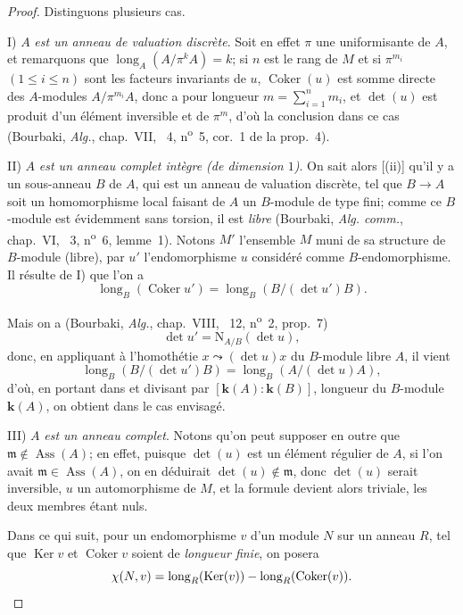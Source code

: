 \begin{proof}
Distinguons plusieurs cas.

I) $A$ \emph{est un anneau de valuation discrète}.
Soit en effet $\pi$ une uniformisante de $A$, et remarquons que $\operatorname{long}_A(A/\pi^kA)=k$;
si $n$ est le rang de $M$ et si $\pi^{m_i}$ $(1\leq i\leq n)$ sont les facteurs invariants de $u$, $\operatorname{Coker}(u)$ est somme directe des $A$-modules $A/\pi^{m_i}A$, donc a pour longueur $m=\sum_{i=1}^nm_i$, et $\det(u)$ est produit d'un élément inversible et de $\pi^m$, d'où la conclusion dans ce cas (Bourbaki, \emph{Alg.}, chap.~VII, \textsection~4, n\textsuperscript{o}~5, cor.~1 de la prop.~4).

II) $A$ \emph{est un anneau complet intègre (de dimension $1$)}.
On sait alors [(ii)] qu'il y a un sous-anneau $B$ de $A$, qui est un anneau de valuation discrète, tel que $B\to A$ soit un homomorphisme local faisant de $A$ un $B$-module de type fini;
comme ce $B$-module est évidemment sans torsion, il est \emph{libre} (Bourbaki, \emph{Alg. comm.}, chap.~VI, \textsection~3, n\textsuperscript{o}~6, lemme~1).
Notons $M'$ l'ensemble $M$ muni de sa structure de $B$-module (libre), par $u'$ l'endomorphisme $u$ considéré comme $B$-endomorphisme.
Il résulte de I) que l'on a
\[
\label{IV.21.10.17.5}
  \operatorname{long}_B(\operatorname{Coker}u')=\operatorname{long}_B(B/(\det u')B).
  \tag{21.10.17.5}
\]

Mais on a (Bourbaki, \emph{Alg.}, chap.~VIII, \textsection~12, n\textsuperscript{o}~2, prop.~7)
\[
  \det u'=\mathrm{N}_{A/B}(\det u),
\]
donc, en appliquant  à l'homothétie $x\leadsto(\det u)x$ du $B$-module libre $A$, il vient
\[
  \operatorname{long}_B(B/(\det u')B)=\operatorname{long}_B(A/(\det u)A),
\]
d'où, en portant dans  et divisant par $[\boldsymbol{k}(A):\boldsymbol{k}(B)]$, longueur du $B$-module $\boldsymbol{k}(A)$, on obtient  dans le cas envisagé.

III) $A$ \emph{est un anneau complet}.
Notons qu'on peut supposer en outre que $\mathfrak{m}\notin\operatorname{Ass}(A)$;
en effet, puisque $\det(u)$ est un élément régulier de $A$, si l'on avait $\mathfrak{m}\in\operatorname{Ass}(A)$, on en déduirait $\det(u)\notin\mathfrak{m}$, donc $\det(u)$ serait inversible, $u$ un automorphisme de $M$, et la formule  devient alors triviale, les deux membres étant nuls.

Dans ce qui suit, pour un endomorphisme $v$ d'un module $N$ sur un anneau $R$, tel que $\operatorname{Ker}v$ et $\operatorname{Coker}v$ soient de \emph{longueur finie}, on posera
\[
  \chi(N,v)=\operatorname{long}_R(\operatorname{Ker}(v))-\operatorname{long}_R(\operatorname{Coker}(v)).
\]


\end{proof}
